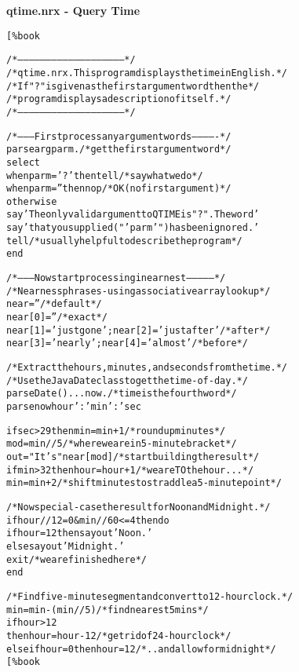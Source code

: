 \index{,}
\textbf{qtime.nrx - Query Time}
\begin{alltt}
[\%book

/*--------------------------------------------------------*/
/* qtime.nrx.  This program displays the time in English. */
/* If "?" is given as the first argument word then the    */
/* program displays a description of itself.              */
/*--------------------------------------------------------*/

/*--------- First process any argument words -------------*/
parse arg parm .           /* get the first argument word */
select
  when parm='?' then tell               /* say what we do */
  when parm=''  then nop        /* OK (no first argument) */
  otherwise
    say 'The only valid argument to QTIME is "?".  The word'
    say 'that you supplied ("'parm'") has been ignored.'
    tell       /* usually helpful to describe the program */
  end

/*-------- Now start processing in earnest ---------------*/
/* Nearness phrases - using associative array lookup      */
near=''                                        /* default */
near[0]=''                                       /* exact */
near[1]=' just gone';  near[2]=' just after'     /* after */
near[3]=' nearly';     near[4]=' almost'        /* before */

/* Extract the hours, minutes, and seconds from the time. */
/* Use the Java Date class to get the time-of-day.        */
parse Date() . . . now .       /* time is the fourth word */
parse now hour':'min':'sec

if sec>29 then min=min+1              /* round up minutes */
mod=min//5            /* where we are in 5-minute bracket */
out="It's"near[mod]          /* start building the result */
if min>32 then hour=hour+1       /* we are TO the hour... */
min=min+2   /* shift minutes to straddle a 5-minute point */

/* Now special-case the result for Noon and Midnight.     */
if hour//12=0 & min//60<=4 then do
  if hour=12 then say out 'Noon.'
             else say out 'Midnight.'
  exit                            /* we are finished here */
  end

/* Find five-minute segment and convert to 12-hour clock. */
min=min-(min//5)                   /* find nearest 5 mins */
if hour>12
 then hour=hour-12            /* get rid of 24-hour clock */
 else if hour=0 then hour=12 /* .. and allow for midnight */
[\%book
\end{alltt}
